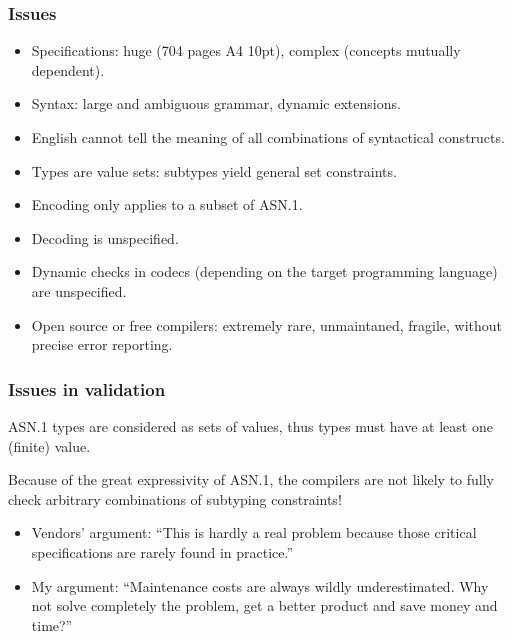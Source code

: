 \documentclass[compress,dvips,xcolor={dvipsnames},t]{beamer}
\newcommand\ASN{\textsf{ASN.1}\xspace}
\begin{document}
\begin{frame}
\frametitle{Issues}

\begin{itemize}

  \item Specifications: huge (704 pages A4 10pt), complex (concepts
  mutually dependent).

  \item Syntax: large and ambiguous grammar, dynamic extensions.

  \item English cannot tell the meaning of all combinations of
    syntactical constructs.

  \item Types are value sets: subtypes yield general set constraints.

  \item Encoding only applies to a subset of \ASN.

  \item Decoding is unspecified.

  \item Dynamic checks in codecs (depending on the target programming
    language) are unspecified.

  \item Open source or free compilers: extremely rare, unmaintaned,
    fragile, without precise error reporting.

\end{itemize}

\end{frame}

\begin{frame}
\frametitle{Issues in validation}

\ASN types are considered as sets of values, thus types must have at
least one (finite) value.

\bigskip

Because of the great expressivity of \ASN, the compilers are not
likely to fully check arbitrary combinations of subtyping
constraints!

\bigskip

\begin{itemize}

  \item Vendors' argument: ``This is hardly a real problem because
    those critical specifications are rarely found in practice.''

    \item My argument: ``Maintenance costs are always wildly
      underestimated. Why not solve completely the problem, get a
      better product and save money and time?''

\end{itemize}

\end{frame}
\end{document}
